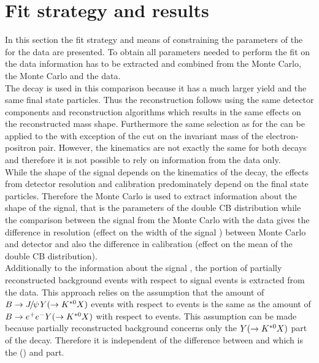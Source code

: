 \section{Fit strategy and results}
\label{sec:fitstrat}
In this section the fit strategy and means of constraining the parameters of the \PDF for the \BdKstee \lhcb data are presented. To obtain all parameters needed to perform the fit on the \BdKstee \lhcb data information has to be extracted and combined from the \BdKstee Monte Carlo, the \BdToJPsieeKst Monte Carlo and the \BdToJPsieeKst \lhcb data.\\
The \BdToJPsieeKst decay is used in this comparison because it has a much larger yield and the same final state particles. Thus the reconstruction follows using the same detector components and reconstruction algorithms which results in the same effects on the reconstructed \Bd mass shape. Furthermore the same selection as for the \BdKstee can be applied to the \BdToJPsieeKst with exception of the cut on the invariant mass of the electron-positron pair. However, the kinematics are not exactly the same for both decays and therefore it is not possible to rely on information from the \BdToJPsieeKst data only. \\
While the shape of the \BdKstee signal \PDF depends on the kinematics of the decay, the effects from detector resolution and calibration predominately depend on the final state particles. Therefore the \BdKstee Monte Carlo is used to extract information about the shape of the signal, that is the parameters of the double CB distribution while the comparison between the signal \PDF from the \BdToJPsieeKst Monte Carlo with the \BdToJPsieeKst data gives the difference in resolution (effect on the width of the signal \PDF) between Monte Carlo and detector and also the difference in calibration (effect on the mean of the double CB distribution). \\
Additionally to the information about the signal \PDF, the portion of partially reconstructed background events with respect to signal events is extracted from the \BdToJPsieeKst data. This approach relies on the assumption that the amount of $\B \rightarrow \jpsi Y(\rightarrow \Kstarz X)$ events with respect to \BdToJPsieeKst events is the same as the amount of $B \rightarrow e^+e^- Y(\rightarrow K^{*0} X)$ with respect to \BdKstee events. This assumption can be made because partially reconstructed background concerns only the $Y(\rightarrow K^{*0} X)$ part of the decay. Therefore it is independent of the difference between \BdKstee and \BdToJPsieeKst which is the (\epem) and \jpsi part.\\
